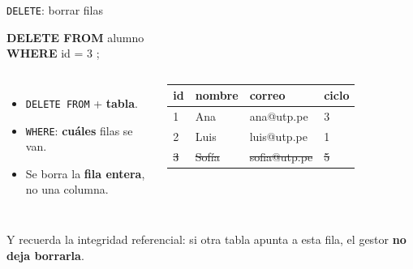 \documentclass[aspectratio=169,10pt,c]{beamer}
\newcommand{\kw}[1]{\textcolor{utpRojo}{\textbf{#1}}}
\newcommand{\nuevo}[1]{{%
  \setlength{\fboxsep}{1.2pt}%
  \begingroup
  \renewcommand{\kw}[1]{\textcolor{utpNegro}{\textbf{##1}}}%
  \colorbox{yellow!45}{\textcolor{utpNegro}{#1}}%
  \endgroup}}
\newenvironment{sqlcode}[1][.86\textwidth]
  {\begin{center}\begin{lrbox}{\sqlbuf}\begin{minipage}{#1}\ttfamily\footnotesize\vspace{6pt}\raggedright}
  {\vspace{6pt}\end{minipage}\end{lrbox}\colorbox{utpGrisClaro}{\usebox{\sqlbuf}}\end{center}}
\begin{document}
\begin{frame}{\texttt{DELETE}: borrar filas}
\begin{sqlcode}[.78\textwidth]
\kw{DELETE FROM} alumno\\
\nuevo{\kw{WHERE} id = 3};
\end{sqlcode}
\vspace{0.1cm}
\begin{columns}[c,onlytextwidth]
\small
\begin{itemize}\setlength\itemsep{4pt}
  \item \texttt{DELETE FROM} + \textbf{tabla}.
  \item \texttt{WHERE}: \textbf{cuáles} filas se van.
  \item Se borra la \textbf{fila entera}, no una columna.
\end{itemize}
\centering\scriptsize\ttfamily
\begin{tabular}{llll}
\toprule
\normalfont\bfseries id & \normalfont\bfseries nombre & \normalfont\bfseries correo & \normalfont\bfseries ciclo \\
\midrule
1 & Ana & ana@utp.pe & 3 \\
2 & Luis & luis@utp.pe & 1 \\
\color{utpGrisMedio}\sout{3} & \color{utpGrisMedio}\sout{Sofía} & \color{utpGrisMedio}\sout{sofia@utp.pe} & \color{utpGrisMedio}\sout{5} \\
\bottomrule
\end{tabular}
\end{columns}
\vspace{0.35cm}
\vspace{0.1cm}
\small Y recuerda la integridad referencial: si otra tabla apunta a esta fila, el gestor \textbf{no deja borrarla}.
\end{frame}
\end{document}
